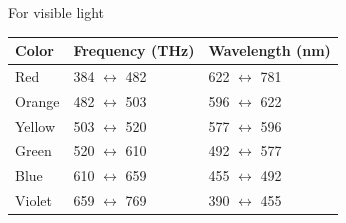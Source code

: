 \documentclass[../../main.tex]{subfiles}
\begin{document}
For visible light
\begin{center}
        \begin{longtable}{| p{} | p{} | p{} |}
            \hline
            Color&Frequency (THz)&Wavelength (nm)\\\hline\hline
            Red&384 $\leftrightarrow$ 482&622 $\leftrightarrow$ 781\\
        Orange&482 $\leftrightarrow$ 503&596 $\leftrightarrow$ 622\\
        Yellow&503 $\leftrightarrow$ 520&577 $\leftrightarrow$ 596\\
        Green&520 $\leftrightarrow$ 610&492 $\leftrightarrow$ 577\\
        Blue&610 $\leftrightarrow$ 659&455 $\leftrightarrow$ 492\\
        Violet&659 $\leftrightarrow$ 769&390 $\leftrightarrow$ 455\\\hline
        \end{longtable}    
\end{center}%
\end{document}
